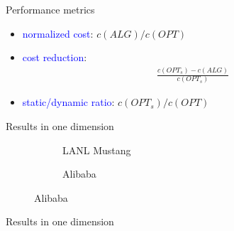 \documentclass{beamer}
\def\b{\textcolor{blue}}
\begin{document}
\begin{frame}{Performance metrics}
\begin{itemize}
    \item \b{normalized cost}: $c(ALG) / c(OPT)$\pause
    \item \b{cost reduction}: \begin{align*}
        \frac{c(OPT_s) - c(ALG)}{c(OPT_s)}
    \end{align*}\pause
    \item \b{static/dynamic ratio}: $c(OPT_s) / c(OPT)$
\end{itemize}
\end{frame}

\begin{frame}{Results in one dimension}
\begin{figure}
    \begin{subfigure}[b]{.50\linewidth}
    \resizebox{\textwidth}{!}{}
    \caption{LANL Mustang}
    \end{subfigure}
    \begin{subfigure}[b]{.48\linewidth}
    \resizebox{\textwidth}{!}{}
    \caption{Alibaba}
    \end{subfigure}
\end{figure}
\end{frame}

\begin{frame}{Results in one dimension}
\begin{figure}
    \begin{subfigure}[b]{.38\linewidth}
    \resizebox{\textwidth}{!}{}
    \end{subfigure}\pause
    \begin{subfigure}[b]{.38\linewidth}
    \resizebox{\textwidth}{!}{}
    \end{subfigure}\pause
    \par\bigskip
    \begin{subfigure}[b]{.38\linewidth}
    \resizebox{\textwidth}{!}{}
    \end{subfigure}
\end{figure}
\end{frame}
\end{document}
